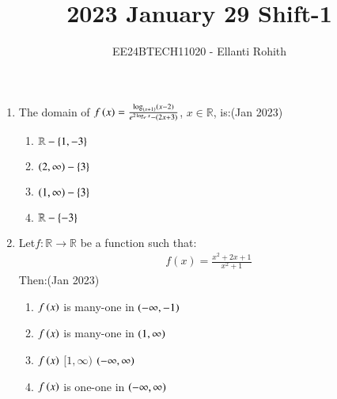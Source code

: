 \documentclass[journal,12pt,onecolumn]{IEEEtran}
\theoremstyle{remark}
\begin{document}

\vspace{3cm}

\title{2023 January 29 Shift-1}
\author{EE24BTECH11020 -  Ellanti Rohith}
\maketitle

\renewcommand{\thefigure}{\theenumi}
\renewcommand{\thetable}{\theenumi}

\begin{enumerate}

\item The domain of $f\left(x\right) = \frac{\log_{(x+1)}(x-2)}{e^{2 \log_e x} - (2x + 3)} $, $ x \in \mathbb{R} $, is:\hfill(Jan 2023)
\begin{multicols}{4}
    \begin{enumerate}
    \item $\mathbb{R} - \left\{1,-3\right\}$ 
    \item $\left(2,\infty\right) - \left\{3\right\}$ 
     \item $\left(1,\infty\right) - \left\{3\right\}$ 
    \item $\mathbb{R} - \left\{-3\right\}$ 
\end{enumerate}
\end{multicols}


\item Let$f: \mathbb{R} \to \mathbb{R} $ be a function such that:
   \begin{align*}
        f(x) = \frac{x^2 + 2x + 1}{x^{2} + 1}
   \end{align*}
   Then:\hfill(Jan 2023)
   \begin{enumerate}
       \item $f\left(x\right)$  is many-one in  $\left(-\infty, -1\right)$
       \item $f\left(x\right)$  is many-one in  $\left(1,\infty\right)$
       \item $f\left(x\right)$  $[1 ,\infty) $  $\left(-\infty, \infty\right)$

       
       \item $ f\left(x\right)$  is one-one in  $\left(-\infty, \infty\right)$
   \end{enumerate}


\end{enumerate}
\end{document}
